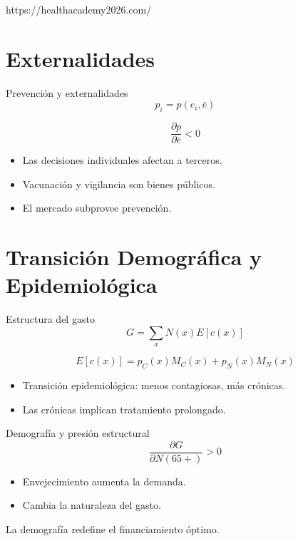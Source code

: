 https://healthacademy2026.com/\documentclass[10pt]{beamer}
\begin{document}
\section{Externalidades}

\begin{frame}{Prevención y externalidades}
\[
p_i = p(e_i,\bar e)
\]

\[
\frac{\partial p}{\partial \bar e}<0
\]

\begin{itemize}
\item Las decisiones individuales afectan a terceros.
\item Vacunación y vigilancia son bienes públicos.
\item El mercado subprovee prevención.
\end{itemize}
\end{frame}

\section{Transición Demográfica y Epidemiológica}

\begin{frame}{Estructura del gasto}
\[
G = \sum_x N(x)E[c(x)]
\]

\[
E[c(x)] = p_C(x)M_C(x) + p_N(x)M_N(x)
\]

\begin{itemize}
\item Transición epidemiológica: menos contagiosas, más crónicas.
\item Las crónicas implican tratamiento prolongado.
\end{itemize}
\end{frame}

\begin{frame}{Demografía y presión estructural}
\[
\frac{\partial G}{\partial N(65+)} > 0
\]

\begin{itemize}
\item Envejecimiento aumenta la demanda.
\item Cambia la naturaleza del gasto.
\end{itemize}

\bigskip
La demografía redefine el financiamiento óptimo.
\end{frame}

\end{document}

